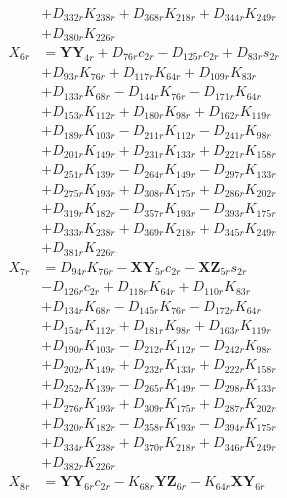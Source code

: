 \begin{multicols}{2}
\begin{align}
&+ D_{332r}K_{238r} + D_{368r}K_{218r} + D_{344r}K_{249r}  \nonumber \\
&+ D_{380r}K_{226r} \nonumber \\
X_{6r} &= \mathbf{YY}_{4r} + D_{76r}c_{2r} - D_{125r}c_{2r} + D_{83r}s_{2r}  \nonumber \\
&+ D_{93r}K_{76r} + D_{117r}K_{64r} + D_{109r}K_{83r}  \nonumber \\
&+ D_{133r}K_{68r} - D_{144r}K_{76r} - D_{171r}K_{64r}  \nonumber \\
&+ D_{153r}K_{112r} + D_{180r}K_{98r} + D_{162r}K_{119r}  \nonumber \\
&+ D_{189r}K_{103r} - D_{211r}K_{112r} - D_{241r}K_{98r}  \nonumber \\
&+ D_{201r}K_{149r} + D_{231r}K_{133r} + D_{221r}K_{158r}  \nonumber \\
&+ D_{251r}K_{139r} - D_{264r}K_{149r} - D_{297r}K_{133r}  \nonumber \\
&+ D_{275r}K_{193r} + D_{308r}K_{175r} + D_{286r}K_{202r}  \nonumber \\
&+ D_{319r}K_{182r} - D_{357r}K_{193r} - D_{393r}K_{175r}  \nonumber \\
&+ D_{333r}K_{238r} + D_{369r}K_{218r} + D_{345r}K_{249r}  \nonumber \\
&+ D_{381r}K_{226r} \nonumber \\
X_{7r} &= D_{94r}K_{76r} - \mathbf{XY}_{5r}c_{2r} - \mathbf{XZ}_{5r}s_{2r}  \nonumber \\
&- D_{126r}c_{2r} + D_{118r}K_{64r} + D_{110r}K_{83r}  \nonumber \\
&+ D_{134r}K_{68r} - D_{145r}K_{76r} - D_{172r}K_{64r}  \nonumber \\
&+ D_{154r}K_{112r} + D_{181r}K_{98r} + D_{163r}K_{119r}  \nonumber \\
&+ D_{190r}K_{103r} - D_{212r}K_{112r} - D_{242r}K_{98r}  \nonumber \\
&+ D_{202r}K_{149r} + D_{232r}K_{133r} + D_{222r}K_{158r}  \nonumber \\
&+ D_{252r}K_{139r} - D_{265r}K_{149r} - D_{298r}K_{133r}  \nonumber \\
&+ D_{276r}K_{193r} + D_{309r}K_{175r} + D_{287r}K_{202r}  \nonumber \\
&+ D_{320r}K_{182r} - D_{358r}K_{193r} - D_{394r}K_{175r}  \nonumber \\
&+ D_{334r}K_{238r} + D_{370r}K_{218r} + D_{346r}K_{249r}  \nonumber \\
&+ D_{382r}K_{226r} \nonumber \\
X_{8r} &= \mathbf{YY}_{6r}c_{2r} - K_{68r}\mathbf{YZ}_{6r} - K_{64r}\mathbf{XY}_{6r}  \nonumber \\

\end{align}
\end{multicols}
